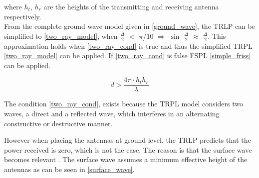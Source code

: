 where $h_t$, $h_r$ are the heights of the transmitting and receiving antenna respectively. \\
From the complete ground wave model given in \eqref{ground_wave}, the TRLP can be simplified to \eqref{two_ray_model}, when $\frac{\Delta}{2}$ $<$ $\pi$/$10$ $\Rightarrow$ $\sin$ $\frac{\Delta}{2}$ $\approx$ $\frac{\Delta}{2}$. This approximation holds when \eqref{two_ray_cond} is true and thus the simplified TRPL \eqref{two_ray_model} can be applied. If \eqref{two_ray_cond} is false FSPL \eqref{simple_friss} can be applied.
  
\begin{equation}
d > \frac{4\pi \cdot h_t h_r }{\lambda}
\label{two_ray_cond}
\end{equation}
 

The condition \eqref{two_ray_cond}, exists because the TRPL model considers two waves, a direct and a reflected wave, which interferes in an alternating constructive or destructive manner.










However when placing the antennas at ground level, the TRLP predicts that the power received is zero, which is not the case.
The reason is that the surface wave becomes relevant \cite{Chong}. The surface wave assumes a minimum effective height of the antennas as can be seen in \eqref{surface_wave}. 

